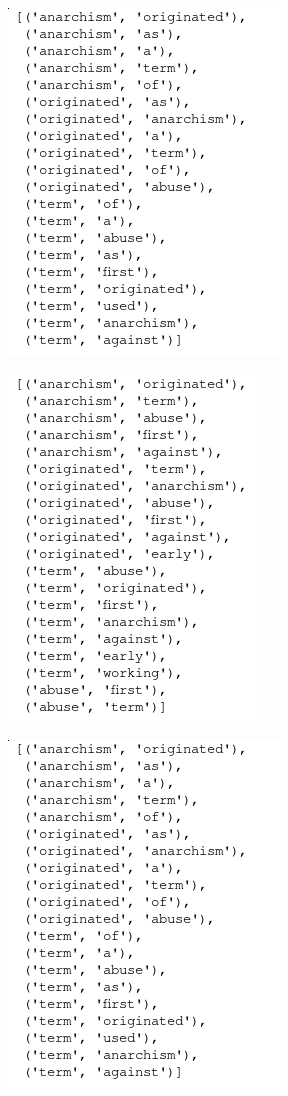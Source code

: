 \documentclass{scrartcl}
\begin{document}
\begin{figure}
\centering
\begin{minipage}{.3\textwidth}
  \centering
  \includegraphics[scale=0.69]{online_sampling_example}
  \label{fig:test1}
\end{minipage}%
\begin{minipage}{.3\textwidth}
  \centering
  \includegraphics[scale=0.69]{preprocessing_sampling_example}
  \label{fig:test2}
\end{minipage}
\begin{minipage}{.3\textwidth}
  \centering
  \includegraphics[scale=0.69]{online_sampling_example}

\end{minipage}
\end{figure}
\end{document}
